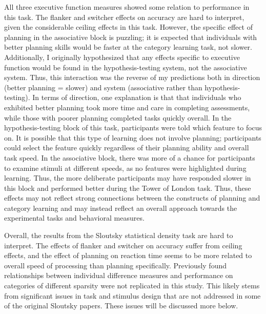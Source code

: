 \documentclass[../dissertation.tex]{subfiles}
\begin{document}
	All three executive function measures showed some relation to performance in this task. The flanker and switcher effects on accuracy are hard to interpret, given the considerable ceiling effects in this task. However, the specific effect of planning in the associative block is puzzling; it is expected that individuals with better planning skills would be faster at the category learning task, not slower. Additionally, I originally hypothesized that any effects specific to executive function would be found in the hypothesis-testing system, not the associative system. Thus, this interaction was the reverse of my predictions both in direction (better planning = slower) and system (associative rather than hypothesis-testing). In terms of direction, one explanation is that that individuals who exhibited better planning took more time and care in completing assessments, while those with poorer planning completed tasks quickly overall. In the hypothesis-testing block of this task, participants were told which feature to focus on. It is possible that this type of learning does not involve planning; participants could select the feature quickly regardless of their planning ability and overall task speed. In the associative block, there was more of a chance for participants to examine stimuli at different speeds, as no features were highlighted during learning. Thus, the more deliberate participants may have responded slower in this block and performed better during the Tower of London task. Thus, these effects may not reflect strong connections between the constructs of planning and category learning and may instead reflect an overall approach towards the experimental tasks and behavioral measures. \par
	Overall, the results from the Sloutsky statistical density task are hard to interpret. The effects of flanker and switcher on accuracy suffer from ceiling effects, and the effect of planning on reaction time seems to be more related to overall speed of processing than planning specifically. Previously found relationships between individual difference measures and performance on categories of different sparsity were not replicated in this study. This likely stems from significant issues in task and stimulus design that are not addressed in some of the original Sloutsky papers. These issues will be discussed more below.
	
\end{document}
